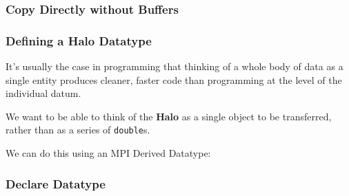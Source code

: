 \subsubsection{Copy Directly without
Buffers}\label{copy-directly-without-buffers}

\begin{Shaded}
\begin{Highlighting}[]

 
\NormalTok{\}}
\end{Highlighting}
\end{Shaded}

\subsubsection{Defining a Halo Datatype}\label{defining-a-halo-datatype}

It's usually the case in programming that thinking of a whole body of
data as a single entity produces cleaner, faster code than programming
at the level of the individual datum.

We want to be able to think of the \textbf{Halo} as a single object to
be transferred, rather than as a series of \texttt{double}s.

We can do this using an MPI Derived Datatype:

\subsubsection{Declare Datatype}\label{declare-datatype}

\begin{Shaded}
\begin{Highlighting}[]

 
\NormalTok{\}}
\end{Highlighting}
\end{Shaded}

